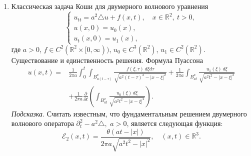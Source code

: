 \documentclass[unicode,12pt,draft]{article}
\begin{document}
\begin{enumerate}
\item
Классическая задача Коши для двумерного волнового уравнения
$$
    \left\{
        \begin{array}{l}
            u_{tt} = a^2 \triangle u + f (x, t),
            \quad
            x \in {\mathbb R}^2,
            \:
            t > 0,
            \\
            u (x, 0) = u_0 (x),
            \\
            u_t (x, 0) = u_1 (x),
        \end{array}
    \right.
$$
где $a > 0$, $f \in C^2 ({\mathbb R}^2 \times [0, \infty))$, $u_0
\in C^3 ({\mathbb R}^2)$, $u_1 \in C^2 ({\mathbb R}^2)$.
Существование и единственность решения. Формула Пуассона
\begin{align*}
    u (x, t)
    =
    {}
    &
    \frac{
        1
    }{
        2
        \pi
        a
    }
    \int_0^t
    \int_{
        B_{
            a (t - \tau)
        }^x
    }
    \frac{
        f (\xi, \tau)
        \,
        d\xi
        d\tau
    }{
        \sqrt{
            a^2 (t - \tau)^2
            -
            |x - \xi|^2
        }
    }
    +
    \frac{
        1
    }{
        2
        \pi
        a
    }
    \int_{
        B_{
            a t
        }^x
    }
    \frac{
        u_1 (\xi)
        \,
        d\xi
    }{
        \sqrt{
            a^2 t^2
            -
            |x - \xi|^2
        }
    }
    \\
    &
    +
    \frac{
        1
    }{
        2
        \pi
        a
    }
    \frac{\partial}{\partial t}
    \left(
        \int_{
            B_{
                a t
            }^x
        }
        \frac{
            u_0 (\xi)
            \,
            d\xi
        }{
            \sqrt{
                a^2 t^2
                -
                |x - \xi|^2
            }
        }
    \right).
\end{align*}
{\it Подсказка.} Считать известным, что фундаментальным решением
двумерного волнового оператора $
    \partial_t^2 - a^2 \triangle,
$ $a > 0$, является следующая функция:
$$
    {\mathcal E}_2 (x, t)
    =
    \frac{
        \theta (at - |x|)
    }{
        2
        \pi
        a
        \sqrt{
            a^2 t^2 - |x|^2
        }
    },
    \quad
    (x, t)
    \in
    {\mathbb R}^3.
$$


\end{enumerate}
\end{document}
